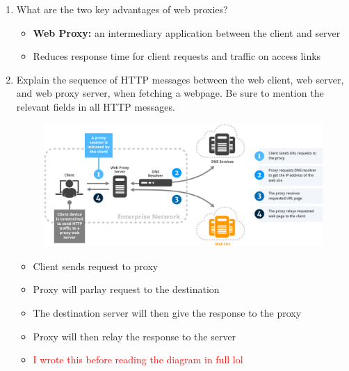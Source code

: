 \documentclass{article}
\begin{document}
\begin{enumerate}
\item What are the two key advantages of web proxies?
\begin{itemize}
\item \textbf{Web Proxy:} an intermediary application between the client and server
\item Reduces response time for client requests and traffic on access links
\end{itemize}
\item Explain the sequence of HTTP messages between the web client, web server, and web proxy server, when fetching a webpage. Be sure to mention the relevant fields in all HTTP messages.
\begin{figure}[!h]
\centering
\includegraphics[width=13cm]{Web-Proxy-how-does-it-work}
\end{figure}

\begin{itemize}
\item Client sends request to proxy
\item Proxy will parlay request to the destination
\item The destination server will then give the response to the proxy
\item Proxy will then relay the response to the server
\item \textcolor{red}{I wrote this before reading the diagram in full lol}
\end{itemize}
\end{enumerate}
\end{document}
